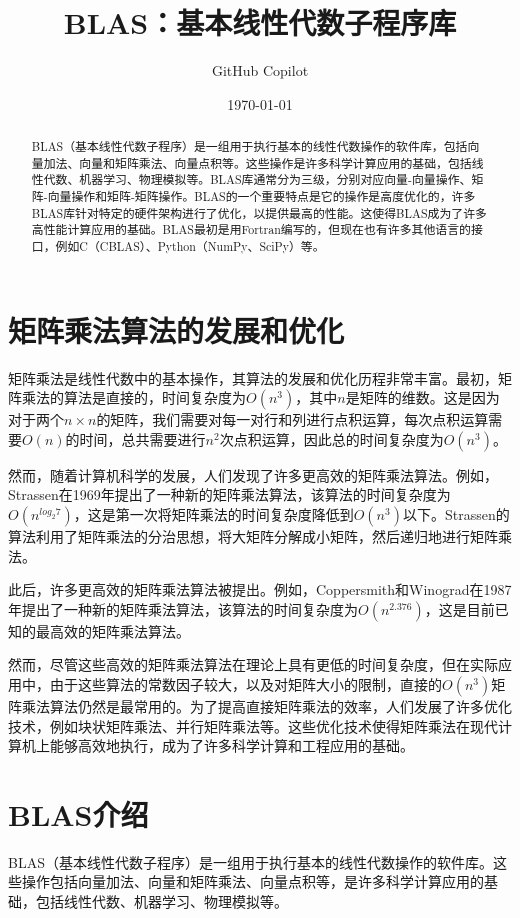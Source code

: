 \documentclass{ctexart}
\title{BLAS：基本线性代数子程序库}
\author{GitHub Copilot}
\date{\today}
\begin{document}
\maketitle

\begin{abstract}
    BLAS（基本线性代数子程序）是一组用于执行基本的线性代数操作的软件库，包括向量加法、向量和矩阵乘法、向量点积等。这些操作是许多科学计算应用的基础，包括线性代数、机器学习、物理模拟等。BLAS库通常分为三级，分别对应向量-向量操作、矩阵-向量操作和矩阵-矩阵操作。BLAS的一个重要特点是它的操作是高度优化的，许多BLAS库针对特定的硬件架构进行了优化，以提供最高的性能。这使得BLAS成为了许多高性能计算应用的基础。BLAS最初是用Fortran编写的，但现在也有许多其他语言的接口，例如C（CBLAS）、Python（NumPy、SciPy）等。
\end{abstract}

\section{矩阵乘法算法的发展和优化}
矩阵乘法是线性代数中的基本操作，其算法的发展和优化历程非常丰富。最初，矩阵乘法的算法是直接的，时间复杂度为$O(n^3)$，其中$n$是矩阵的维数。这是因为对于两个$n \times n$的矩阵，我们需要对每一对行和列进行点积运算，每次点积运算需要$O(n)$的时间，总共需要进行$n^2$次点积运算，因此总的时间复杂度为$O(n^3)$。

然而，随着计算机科学的发展，人们发现了许多更高效的矩阵乘法算法。例如，Strassen在1969年提出了一种新的矩阵乘法算法，该算法的时间复杂度为$O(n^{log_2 7})$，这是第一次将矩阵乘法的时间复杂度降低到$O(n^3)$以下。Strassen的算法利用了矩阵乘法的分治思想，将大矩阵分解成小矩阵，然后递归地进行矩阵乘法。

此后，许多更高效的矩阵乘法算法被提出。例如，Coppersmith和Winograd在1987年提出了一种新的矩阵乘法算法，该算法的时间复杂度为$O(n^{2.376})$，这是目前已知的最高效的矩阵乘法算法。

然而，尽管这些高效的矩阵乘法算法在理论上具有更低的时间复杂度，但在实际应用中，由于这些算法的常数因子较大，以及对矩阵大小的限制，直接的$O(n^3)$矩阵乘法算法仍然是最常用的。为了提高直接矩阵乘法的效率，人们发展了许多优化技术，例如块状矩阵乘法、并行矩阵乘法等。这些优化技术使得矩阵乘法在现代计算机上能够高效地执行，成为了许多科学计算和工程应用的基础。

\section{BLAS介绍}
BLAS（基本线性代数子程序）是一组用于执行基本的线性代数操作的软件库。这些操作包括向量加法、向量和矩阵乘法、向量点积等，是许多科学计算应用的基础，包括线性代数、机器学习、物理模拟等。
\end{document}
